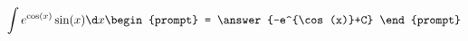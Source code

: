 \documentclass{ximera}
\author{Steven Gubkin}
\begin{document}
\begin{exercise}


\[
\int e^{\cos(x)}\sin(x) \d x \begin{prompt} = \answer{-e^{\cos(x)}+C} \end{prompt}
\]

\end{exercise}
\end{document}
